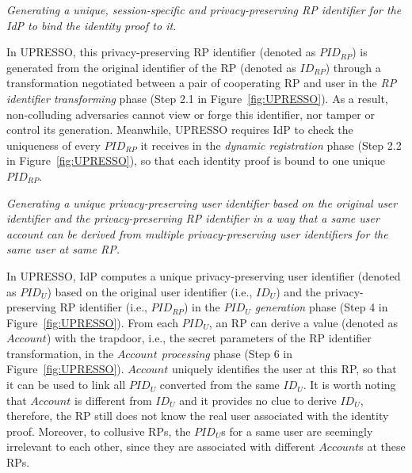 \vspace{1mm} {\em Generating a unique, session-specific and privacy-preserving RP identifier for the IdP to bind the identity proof to it.}

In UPRESSO, this privacy-preserving RP identifier (denoted as $PID_{RP}$) is generated from the original identifier of the RP (denoted as $ID_{RP}$) through a transformation negotiated between a pair of cooperating RP and user in the \emph{RP identifier transforming} phase (Step 2.1 in Figure~\ref{fig:UPRESSO}). As a result, non-colluding adversaries cannot view or forge this identifier, nor tamper or control its generation. Meanwhile, UPRESSO requires IdP to check the uniqueness of every $PID_{RP}$ it receives in the \emph{dynamic registration} phase (Step 2.2 in Figure~\ref{fig:UPRESSO}), so that each identity proof is bound to one unique $PID_{RP}$.



\vspace{1mm} {\em Generating a unique privacy-preserving user identifier based on the original user identifier and the privacy-preserving RP identifier in a way that a same user account can be derived from multiple privacy-preserving user identifiers for the same user at same RP.}


In UPRESSO, IdP computes a unique privacy-preserving user identifier (denoted as $PID_U$) based on the original user identifier (i.e., $ID_U$) and the privacy-preserving RP identifier (i.e., $PID_{RP}$) in the \emph{$PID_U$ generation} phase (Step 4 in Figure~\ref{fig:UPRESSO}). From each $PID_U$, an RP can derive a value (denoted as $Account$) with the trapdoor, i.e., the secret parameters of the RP identifier transformation, in the \emph{$Account$ processing} phase (Step 6 in Figure~\ref{fig:UPRESSO}). $Account$ uniquely identifies the user at this RP, so that it can be used to link all $PID_U$ converted from the same $ID_U$. It is worth noting that $Account$ is different from $ID_U$ and it provides no clue to derive $ID_U$, therefore, the RP still does not know the real user associated with the identity proof. Moreover, to collusive RPs, the $PID_U$s for a same user are seemingly irrelevant to each other, since they are associated with different $Account$s at these RPs.




